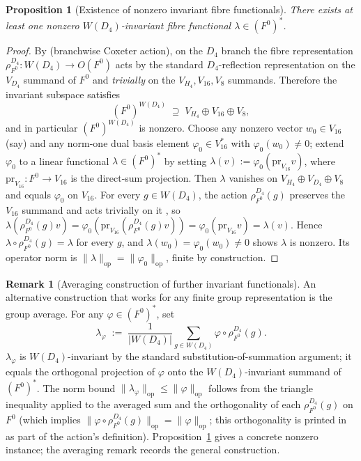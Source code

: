 \documentclass[11pt, a4paper]{amsart}
\newtheorem{proposition}[theorem]{Proposition}
\theoremstyle{definition}
\newtheorem{remark}[theorem]{Remark}
\newcommand{\op}{\operatorname{op}}
\begin{document}
\begin{proposition}[Existence of nonzero invariant fibre functionals]
\label{prop:lambda-exists}
There exists at least one nonzero $W(D_4)$-invariant fibre
functional $\lambda \in (F^0)^\ast$.
\end{proposition}

\begin{proof}
By \cite[Def.~8.1]{RefinementSpaces} (branchwise Coxeter action),
on the $D_4$ branch the fibre representation
$\rho_{F^0}^{D_4} \colon W(D_4) \to O(F^0)$ acts by the standard
$D_4$-reflection representation on the $V_{D_4}$ summand of
$F^0$ and \emph{trivially} on the $V_{H_4}, V_{16}, V_8$
summands. Therefore the invariant subspace satisfies
\[
  (F^0)^{W(D_4)} \;\supseteq\; V_{H_4} \oplus V_{16} \oplus V_8,
\]
and in particular $(F^0)^{W(D_4)}$ is nonzero. Choose any nonzero
vector $w_0 \in V_{16}$ (say) and any norm-one dual basis element
$\varphi_0 \in V_{16}^\ast$ with $\varphi_0(w_0) \neq 0$; extend
$\varphi_0$ to a linear functional $\lambda \in (F^0)^\ast$ by
setting $\lambda(v) := \varphi_0(\mathrm{pr}_{V_{16}} v)$, where
$\mathrm{pr}_{V_{16}} \colon F^0 \to V_{16}$ is the direct-sum
projection. Then $\lambda$ vanishes on $V_{H_4} \oplus V_{D_4}
\oplus V_8$ and equals $\varphi_0$ on $V_{16}$. For every
$g \in W(D_4)$, the action $\rho_{F^0}^{D_4}(g)$ preserves the
$V_{16}$ summand and acts trivially on it
\cite[Def.~8.1]{RefinementSpaces}, so
$\lambda(\rho_{F^0}^{D_4}(g) v) = \varphi_0(\mathrm{pr}_{V_{16}}
(\rho_{F^0}^{D_4}(g) v)) = \varphi_0(\mathrm{pr}_{V_{16}} v) =
\lambda(v)$. Hence $\lambda \circ \rho_{F^0}^{D_4}(g) = \lambda$
for every $g$, and $\lambda(w_0) = \varphi_0(w_0) \neq 0$ shows
$\lambda$ is nonzero. Its operator norm is
$\|\lambda\|_\op = \|\varphi_0\|_\op$, finite by construction.
\end{proof}

\begin{remark}[Averaging construction of further invariant functionals]
\label{rmk:lambda-averaging}
An alternative construction that works for any finite group
representation is the group average. For any
$\varphi \in (F^0)^\ast$, set
\[
  \lambda_\varphi \;:=\; \frac{1}{|W(D_4)|}
    \sum_{g \in W(D_4)}
    \varphi \circ \rho_{F^0}^{D_4}(g).
\]
$\lambda_\varphi$ is $W(D_4)$-invariant by the standard
substitution-of-summation argument; it equals the orthogonal
projection of $\varphi$ onto the $W(D_4)$-invariant summand of
$(F^0)^\ast$. The norm bound $\|\lambda_\varphi\|_\op \leq
\|\varphi\|_\op$ follows from the triangle inequality applied to
the averaged sum and the orthogonality of each
$\rho_{F^0}^{D_4}(g)$ on $F^0$
(which implies $\|\varphi \circ \rho_{F^0}^{D_4}(g)\|_\op =
\|\varphi\|_\op$; this orthogonality is printed in
\cite[Def.~8.1]{RefinementSpaces} as part of the action's
definition). Proposition~\ref{prop:lambda-exists} gives a
concrete nonzero instance; the averaging remark records the
general construction.
\end{remark}
\end{document}
